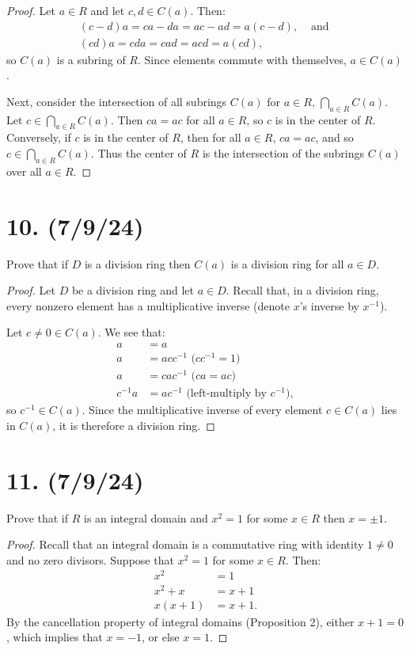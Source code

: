 \documentclass{article}
\begin{document}
\begin{proof}
    Let $a \in R$ and let $c, d \in C(a)$. Then:
    \begin{align*}
        (c - d)a = ca - da = ac - ad = a(c - d),& \text{ and } \\
        (cd)a = cda = cad = acd = a(cd),&
    \end{align*}
    so $C(a)$ is a subring of $R$. Since elements commute with themselves, $a \in C(a)$.

    Next, consider the intersection of all subrings $C(a)$ for $a \in R$, $\bigcap_{a \in R} C(a)$. Let $c \in \bigcap_{a \in R} C(a)$. Then $ca = ac$ for all $a \in R$, so $c$ is in the center of $R$. Conversely, if $c$ is in the center of $R$, then for all $a \in R$, $ca = ac$, and so $c \in \bigcap_{a \in R} C(a)$. Thus the center of $R$ is the intersection of the subrings $C(a)$ over all $a \in R$.
\end{proof}

\section*{10. (7/9/24)}

Prove that if $D$ is a division ring then $C(a)$ is a division ring for all $a \in D$.

\begin{proof}
    Let $D$ be a division ring and let $a \in D$. Recall that, in a division ring, every nonzero element has a multiplicative inverse (denote $x$'s inverse by $x^{-1}$).

    Let $c \neq 0 \in C(a)$. We see that:
    \begin{align*}
        a &= a \\
        a &= a c c^{-1} \text{ ($cc^{-1} = 1$)}\\
        a &= c a c^{-1} \text{ ($ca = ac$)}\\
        c^{-1} a &= a c^{-1} \text{ (left-multiply by $c^{-1}$)},
    \end{align*}
    so $c^{-1} \in C(a)$. Since the multiplicative inverse of every element $c \in C(a)$ lies in $C(a)$, it is therefore a division ring.
\end{proof}

\section*{11. (7/9/24)}

Prove that if $R$ is an integral domain and $x^2 = 1$ for some $x \in R$ then $x = \pm 1$.

\begin{proof}
    Recall that an integral domain is a commutative ring with identity $1 \neq 0$ and no zero divisors. Suppose that $x^2 = 1$ for some $x \in R$. Then:
    \begin{align*}
        x^2 &= 1 \\
        x^2 + x &= x + 1 \\
        x(x + 1) &= x + 1.
    \end{align*}
    By the cancellation property of integral domains (Proposition 2), either $x + 1 = 0$, which implies that $x = -1$, or else $x = 1$.
\end{proof}
\end{document}
